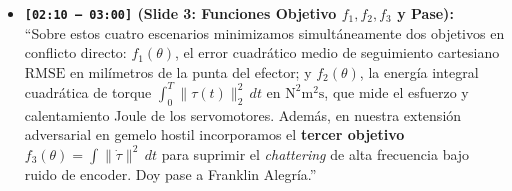 \documentclass[11pt,a4paper]{article}
\begin{document}
\begin{itemize}
    \item \textbf{\texttt{[02:10 -- 03:00]} (Slide 3: Funciones Objetivo $f_1, f_2, f_3$ y Pase):} \\
    ``Sobre estos cuatro escenarios minimizamos simultáneamente dos objetivos en conflicto directo: \textbf{$f_1(\theta)$}, el error cuadrático medio de seguimiento cartesiano $\text{RMSE}$ en milímetros de la punta del efector; y \textbf{$f_2(\theta)$}, la energía integral cuadrática de torque $\int_0^T \|\tau(t)\|_2^2\,dt$ en $\text{N}^2\text{m}^2\text{s}$, que mide el esfuerzo y calentamiento Joule de los servomotores. Además, en nuestra extensión adversarial en gemelo hostil incorporamos el \textbf{tercer objetivo $f_3(\theta) = \int \|\dot{\tau}\|^2\,dt$} para suprimir el \textit{chattering} de alta frecuencia bajo ruido de encoder. Doy pase a Franklin Alegría.''
\end{itemize}

\end{document}
